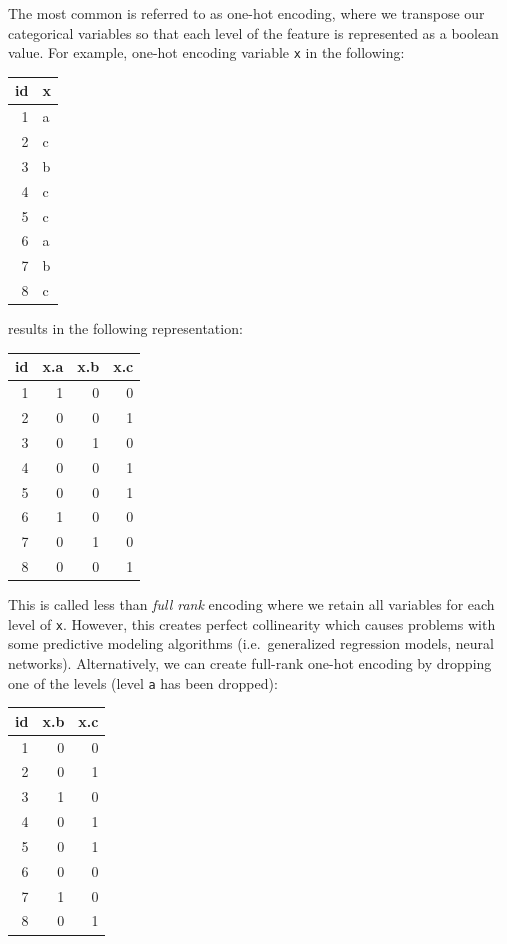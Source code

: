 \documentclass[]{book}
\theoremstyle{definition}
\theoremstyle{definition}
\theoremstyle{definition}
\theoremstyle{remark}
\begin{document}
The most common is referred to as one-hot encoding, where we transpose
our categorical variables so that each level of the feature is
represented as a boolean value. For example, one-hot encoding variable
\texttt{x} in the following:

\begin{tabular}{r|l}
\hline
id & x\\
\hline
1 & a\\
\hline
2 & c\\
\hline
3 & b\\
\hline
4 & c\\
\hline
5 & c\\
\hline
6 & a\\
\hline
7 & b\\
\hline
8 & c\\
\hline
\end{tabular}

results in the following representation:

\begin{tabular}{r|r|r|r}
\hline
id & x.a & x.b & x.c\\
\hline
1 & 1 & 0 & 0\\
\hline
2 & 0 & 0 & 1\\
\hline
3 & 0 & 1 & 0\\
\hline
4 & 0 & 0 & 1\\
\hline
5 & 0 & 0 & 1\\
\hline
6 & 1 & 0 & 0\\
\hline
7 & 0 & 1 & 0\\
\hline
8 & 0 & 0 & 1\\
\hline
\end{tabular}

This is called less than \emph{full rank} encoding where we retain all
variables for each level of \texttt{x}. However, this creates perfect
collinearity which causes problems with some predictive modeling
algorithms (i.e.~generalized regression models, neural networks).
Alternatively, we can create full-rank one-hot encoding by dropping one
of the levels (level \texttt{a} has been dropped):

\begin{tabular}{r|r|r}
\hline
id & x.b & x.c\\
\hline
1 & 0 & 0\\
\hline
2 & 0 & 1\\
\hline
3 & 1 & 0\\
\hline
4 & 0 & 1\\
\hline
5 & 0 & 1\\
\hline
6 & 0 & 0\\
\hline
7 & 1 & 0\\
\hline
8 & 0 & 1\\
\hline
\end{tabular}
\end{document}
